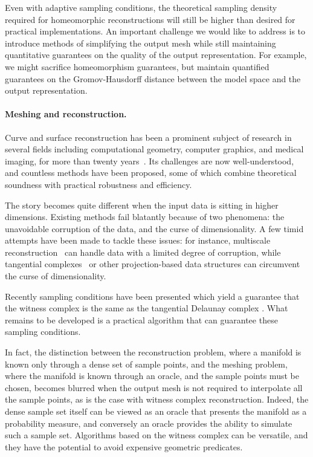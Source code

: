 Even with adaptive sampling conditions, the theoretical sampling
density required for homeomorphic reconstructions will still be higher
than desired for practical implementations. An important challenge we
would like to address is to introduce methods of simplifying the
output mesh while still maintaining quantitative guarantees on the
quality of the output representation. For example, we might sacrifice
homeomorphism guarantees, but maintain quantified guarantees on the
Gromov-Hausdorff distance between the model space and the output
representation. 


\paragraph{Meshing and reconstruction.}
Curve and surface reconstruction has been a prominent subject of
research in several fields including computational geometry, computer
graphics, and medical imaging, for more than twenty
years~\cite{dey-csr-2007}. Its challenges are now well-understood, and
countless methods have been proposed, some of which combine
theoretical soundness with practical robustness and efficiency.

The story becomes quite different when the input data is sitting in
higher dimensions. Existing methods fail blatantly because of two
phenomena: the unavoidable corruption of the data, and the curse of
dimensionality. A few timid attempts have been made to tackle these
issues: for instance, multiscale
reconstruction~\cite{geometrica-bgo-09} can handle data with a limited
degree of corruption, while tangential
complexes~\cite{geometrica-7142i} or other projection-based data
structures can circumvent the curse of dimensionality. 

Recently sampling conditions have been presented which yield a
guarantee that the witness complex is the same as the tangential
Delaunay complex \cite{boissonnat2011cgl,boissonnat2012stab}. What
remains to be developed is a practical algorithm that can guarantee
these sampling conditions.

In fact, the distinction between the reconstruction problem, where a
manifold is known only through a dense set of sample points, and the
meshing problem, where the manifold is known through an oracle, and
the sample points must be chosen, becomes blurred when the output mesh
is not required to interpolate all the sample points, as is the case
with witness complex reconstruction. Indeed, the dense sample set
itself can be viewed as an oracle that presents the manifold as a
probability measure, and conversely an oracle provides the ability to
simulate such a sample set. Algorithms based on the witness complex
can be versatile, and they have the potential to avoid expensive
geometric predicates.

